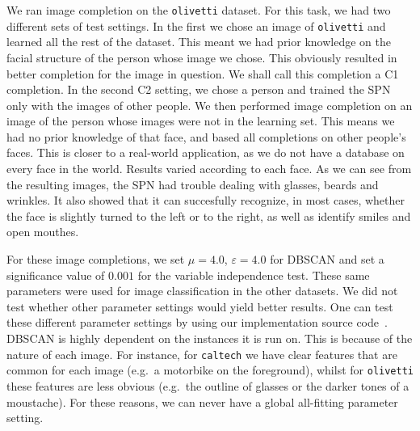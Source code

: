 \documentclass{amsart}
\theoremstyle{plain}
\numberwithin{equation}{section}
\newcommand{\eps}{\varepsilon}
\newcommand{\code}[1]{\lstinline[mathescape=true]{#1}}
\begin{document}
We ran image completion on the \code{olivetti} dataset. For this task, we had two different sets of
test settings. In the first we chose an image of \code{olivetti} and learned all the rest of the
dataset. This meant we had prior knowledge on the facial structure of the person whose image we
chose. This obviously resulted in better completion for the image in question. We shall call this
completion a C1 completion. In the second C2 setting, we chose a person and trained the SPN only
with the images of other people. We then performed image completion on an image of the person whose
images were not in the learning set.  This means we had no prior knowledge of that face, and based
all completions on other people's faces. This is closer to a real-world application, as we do not
have a database on every face in the world. Results varied according to each face. As we can see
from the resulting images, the SPN had trouble dealing with glasses, beards and wrinkles. It also
showed that it can succesfully recognize, in most cases, whether the face is slightly turned to the
left or to the right, as well as identify smiles and open mouthes.

For these image completions, we set $\mu=4.0$, $\eps=4.0$ for DBSCAN and set a significance value
of $0.001$ for the variable independence test. These same parameters were used for image
classification in the other datasets. We did not test whether other parameter settings would yield
better results. One can test these different parameter settings by using our implementation source
code~\cite{gospn}. DBSCAN is highly dependent on the instances it is run on. This is because of the
nature of each image. For instance, for \code{caltech} we have clear features that are common for
each image (e.g.\ a motorbike on the foreground), whilst for \code{olivetti} these features are
less obvious (e.g.\ the outline of glasses or the darker tones of a moustache). For these reasons,
we can never have a global all-fitting parameter setting.
\end{document}
